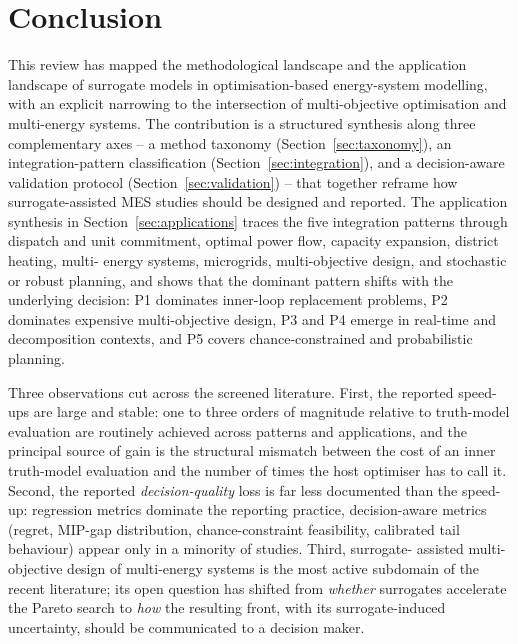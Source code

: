 \section{Conclusion}
\label{sec:conclusion}

This review has mapped the methodological landscape and the
application landscape of surrogate models in optimisation-based
energy-system modelling, with an explicit narrowing to the
intersection of multi-objective optimisation and multi-energy
systems. The contribution is a structured synthesis along three
complementary axes -- a method taxonomy
(Section~\ref{sec:taxonomy}), an integration-pattern classification
(Section~\ref{sec:integration}), and a decision-aware validation
protocol (Section~\ref{sec:validation}) -- that together reframe how
surrogate-assisted MES studies should be designed and reported. The
application synthesis in Section~\ref{sec:applications} traces the
five integration patterns through dispatch and unit commitment,
optimal power flow, capacity expansion, district heating, multi-
energy systems, microgrids, multi-objective design, and stochastic
or robust planning, and shows that the dominant pattern shifts with
the underlying decision: P1 dominates inner-loop replacement
problems, P2 dominates expensive multi-objective design, P3 and P4
emerge in real-time and decomposition contexts, and P5 covers
chance-constrained and probabilistic planning.

Three observations cut across the screened literature. First, the
reported speed-ups are large and stable: one to three orders of
magnitude relative to truth-model evaluation are routinely achieved
across patterns and applications, and the principal source of gain is
the structural mismatch between the cost of an inner truth-model
evaluation and the number of times the host optimiser has to call it.
Second, the reported \emph{decision-quality} loss is far less
documented than the speed-up: regression metrics dominate the
reporting practice, decision-aware metrics (regret, MIP-gap
distribution, chance-constraint feasibility, calibrated tail
behaviour) appear only in a minority of studies. Third, surrogate-
assisted multi-objective design of multi-energy systems is the most
active subdomain of the recent literature; its open question has
shifted from \emph{whether} surrogates accelerate the Pareto search
to \emph{how} the resulting front, with its surrogate-induced
uncertainty, should be communicated to a decision maker.

